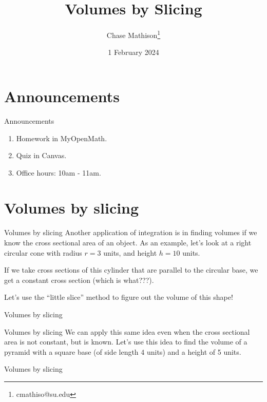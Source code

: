 \documentclass[presentation]{beamer}
\institute[SU]{Shenandoah University}
\author{Chase Mathison\thanks{cmathiso@su.edu}}
\date{1 February 2024}
\title{Volumes by Slicing}
\begin{document}
\maketitle

\section{Announcements}
\label{sec:org7bf6cec}
\begin{frame}[label={sec:orga16ce3e}]{Announcements}
\begin{enumerate}
\item Homework in MyOpenMath.
\item Quiz in Canvas.
\item Office hours: 10am - 11am.
\end{enumerate}
\end{frame}

\section{Volumes by slicing}
\label{sec:org039c35b}
\begin{frame}[label={sec:org0639fcf}]{Volumes by slicing}
Another application of integration is in finding volumes if we know
the cross sectional area of an object.  As an example, let's look at a
right circular cone with radius \(r = 3\) units, and height \(h =
10\) units.

If we take cross sections of this cylinder that are parallel to the
circular base, we get a constant cross section (which is what???).

Let's use the ``little slice'' method to figure out the volume of this
shape!
\end{frame}

\begin{frame}[label={sec:orgcc50f50}]{Volumes by slicing}
\end{frame}

\begin{frame}[label={sec:org5a8c14c}]{Volumes by slicing}
We can apply this same idea even when the cross sectional area is not
constant, but is known.  Let's use this idea to find the volume of a
pyramid with a square base (of side length 4 units) and a height of 5
units.
\vspace{10in}
\end{frame}

\begin{frame}[label={sec:org34f88bf}]{Volumes by slicing}
\end{frame}
\end{document}

